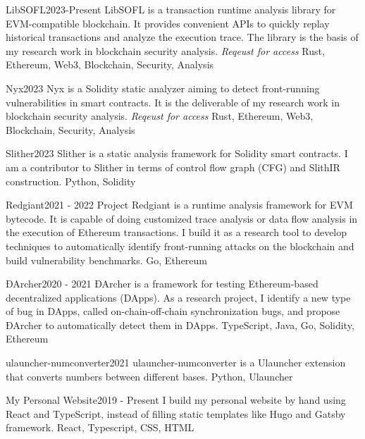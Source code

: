 %
%
%


\begin{projects}
	\project
	{LibSOFL}{2023-Present}
	{LibSOFL is a transaction runtime analysis library for EVM-compatible blockchain. It provides convenient APIs to quickly replay historical transactions and analyze the execution trace. The library is the basis of my research work in blockchain security analysis.}
	{\textit{Reqeust for access}}
	{Rust, Ethereum, Web3, Blockchain, Security, Analysis}

	\project
	{Nyx}{2023}
	{Nyx is a Solidity static analyzer aiming to detect front-running vulnerabilities in smart contracts. It is the deliverable of my research work in blockchain security analysis.}
	{\textit{Reqeust for access}}
	{Rust, Ethereum, Web3, Blockchain, Security, Analysis}


	\project
	{Slither}{2023}
	{}
	{Slither is a static analysis framework for Solidity smart contracts. I am a contributor to Slither in terms of control flow graph (CFG) and SlithIR construction.}
	{Python, Solidity}

	\project
	{Redgiant}{2021 - 2022}
	{}
	{Project Redgiant is a runtime analysis framework for EVM bytecode. It is capable of doing customized trace analysis or data flow analysis in the execution of Ethereum transactions. I build it as a research tool to develop techniques to automatically identify front-running attacks on the blockchain and build vulnerability benchmarks.}
	{Go, Ethereum}

	\project
	{ĐArcher}{2020 - 2021}
	{}
	{ĐArcher is a framework for testing Ethereum-based decentralized applications (DApps). As a research project, I identify a new type of bug in DApps, called on-chain-off-chain synchronization bugs, and propose ĐArcher to automatically detect them in DApps.}
	{TypeScript, Java, Go, Solidity, Ethereum}

	\project
	{ulauncher-numconverter}{2021}
	{}
	{ulauncher-numconverter is a Ulauncher extension that converts numbers between different bases.}
	{Python, Ulauncher}


	\project
	{My Personal Website}{2019 - Present}
	{}
	{I build my personal website by hand using React and TypeScript, instead of filling static templates like Hugo and Gatsby framework.}
	{React, Typescript, CSS, HTML}

\end{projects}
